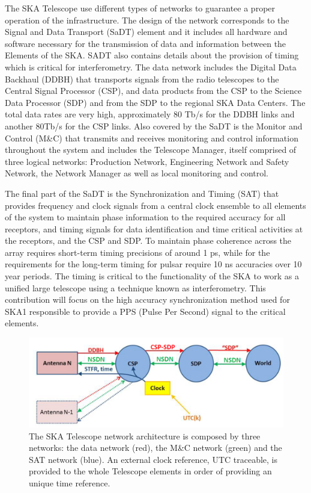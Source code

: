 The SKA Telescope use different types of networks to guarantee a proper operation of the infrastructure. The design of the network corresponds to the Signal and Data Transport (SaDT) element \cite{ska:sadt_website} and it includes all hardware and software necessary for the transmission of data and information between the Elements of the SKA. SADT also contains details about the provision of timing which is critical for interferometry.
The data network includes the Digital Data Backhaul (DDBH) that transports signals from the radio telescopes to the Central Signal Processor (CSP), and data products from the CSP to the Science Data Processor (SDP) and from the SDP to the regional SKA Data Centers. The total data rates are very high, approximately 80 Tb/s for the DDBH links and another 80Tb/s for the CSP links. 
Also covered by the SaDT is the Monitor and Control (M\&C) that transmits and receives monitoring and control information throughout the system and includes the Telescope Manager, itself comprised of three logical networks: Production Network, Engineering Network and Safety Network, the Network Manager as well as local monitoring and control.

The final part of the SaDT is the Synchronization and Timing (SAT) that provides frequency and clock signals from a central clock ensemble to all elements of the system to maintain phase information to the required accuracy for all receptors, and timing signals for data identification and time critical activities at the receptors, and the CSP and SDP. To maintain phase coherence across the array requires short-term timing precisions of around 1 ps, while for the requirements for the long-term timing for pulsar require 10 ns accuracies over 10 year periods. The timing is critical to the functionality of the SKA to work as a unified large telescope using a technique known as interferometry. This contribution will focus on the high accuracy synchronization method used for SKA1 responsible to provide a PPS (Pulse Per Second) signal to the critical elements. 

\begin{figure}[h]
	\includegraphics[scale=0.4]{img/ska_network_arch}
	\caption{The SKA Telescope network architecture is composed by three networks: the data network (red), the M\&C network (green) and the SAT network (blue). An external clock reference, UTC traceable, is provided to the whole Telescope elements in order of providing an unique time reference.}
	\label{fig:ska_net_arch1}
\end{figure}

